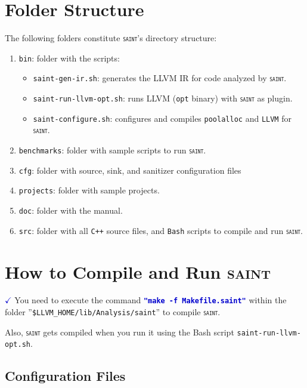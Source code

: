 \documentclass[11pt]{article} %
\newcommand{\saint}{\texttt{\textsc{saint}}\xspace}
\newcommand{\tool}[1]{\texttt{#1}\xspace}
\newcommand{\command}[1]{\textcolor{mediumblue}{\texttt{\textbf{"#1"}}}\xspace}
\newcommand{\script}[1]{\texttt{#1}\xspace}
\newcommand{\mycheckmark}[1]{\textcolor{#1}{$\checkmark$}}
\begin{document}
\section{Folder Structure}
The following folders constitute \saint's directory structure:
\begin{enumerate}[1.]
	\item \texttt{bin}: folder with the scripts:
	\begin{itemize}
		\item \script{saint-gen-ir.sh}: generates the LLVM IR for code analyzed by \saint.
		\item \script{saint-run-llvm-opt.sh}: runs LLVM (\texttt{opt} binary) with \saint as plugin.
		\item \script{saint-configure.sh}: configures and compiles \tool{poolalloc}
		      and \tool{LLVM} for \saint.
	\end{itemize}
	
	\item \texttt{benchmarks}: folder with sample
	scripts to run \saint.

	\item \texttt{cfg}: folder with source, sink, and sanitizer configuration files
		
	\item \texttt{projects}: folder with sample projects.	

	\item \texttt{doc}: folder with the manual.
	
	\item \texttt{src}: folder with all \texttt{C++} source files,
	and \tool{Bash} scripts to compile and run \saint.			
\end{enumerate}

\section{How to Compile and Run \textsc{saint}}

\mycheckmark{mediumblue} You need to execute the command
\command{make -f Makefile.saint} within the
folder ''\texttt{\$LLVM\_HOME/lib/Analysis/saint}'' to compile
\saint.

Also, \saint gets compiled when you run it using
the Bash script \script{saint-run-llvm-opt.sh}.

\subsection{Configuration Files}
\end{document}
